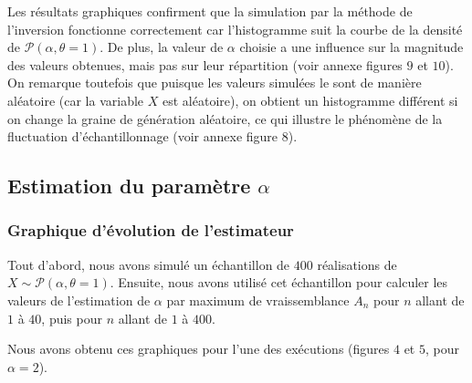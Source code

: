 \documentclass{article}
\begin{document}
Les résultats graphiques confirment que la simulation par la méthode de l'inversion fonctionne correctement car l'histogramme suit la courbe de la densité de $\mathcal{P}(\alpha,\theta=1)$. De plus, la valeur de $\alpha$ choisie a une influence sur la magnitude des valeurs obtenues, mais pas sur leur répartition (voir annexe figures $9$ et $10$). On remarque toutefois que puisque les valeurs simulées le sont de manière aléatoire (car la variable $X$ est aléatoire), on obtient un histogramme différent si on change la graine de génération aléatoire, ce qui illustre le phénomène de la fluctuation d'échantillonnage (voir annexe figure $8$).

\subsection{Estimation du paramètre $\alpha$}

\subsubsection{Graphique d'évolution de l'estimateur}

Tout d'abord, nous avons simulé un échantillon de $400$ réalisations de $X \sim \mathcal{P}(\alpha,\theta=1)$. Ensuite, nous avons utilisé cet échantillon pour calculer les valeurs de l'estimation de $\alpha$ par maximum de vraissemblance $A_n$ pour $n$ allant de $1$ à $40$, puis pour $n$ allant de $1$ à $400$.

Nous avons obtenu ces graphiques pour l'une des exécutions (figures $4$ et $5$, pour $\alpha=2$). 

\clearpage
\end{document}
